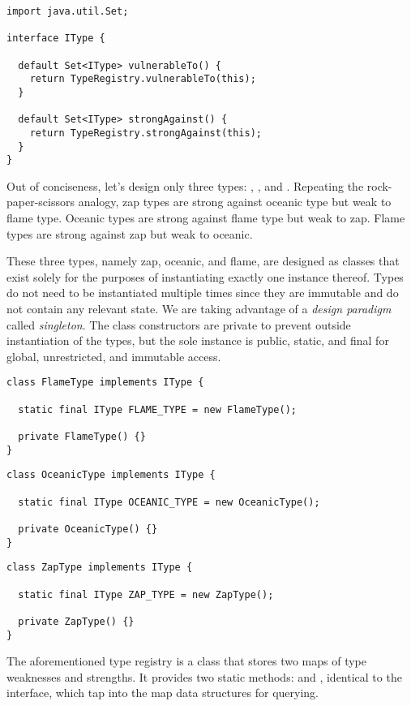 \begin{lstlisting}[language=MyJava]
import java.util.Set;

interface IType {

  default Set<IType> vulnerableTo() {
    return TypeRegistry.vulnerableTo(this);
  }

  default Set<IType> strongAgainst() {
    return TypeRegistry.strongAgainst(this);
  }
}
\end{lstlisting}

Out of conciseness, let's design only three types: , , and . Repeating the rock-paper-scissors analogy, zap types are strong against oceanic type but weak to flame type. Oceanic types are strong against flame type but weak to zap. Flame types are strong against zap but weak to oceanic. 

These three types, namely zap, oceanic, and flame, are designed as classes that exist solely for the purposes of instantiating exactly one instance thereof. 
Types do not need to be instantiated multiple times since they are immutable and do not contain any relevant state. 
We are taking advantage of a \emph{design paradigm} called \emph{singleton}. 
The class constructors are private to prevent outside instantiation of the types, but the sole instance is public, static, and final for global, unrestricted, and immutable access.

\begin{lstlisting}[language=MyJava]
class FlameType implements IType {

  static final IType FLAME_TYPE = new FlameType();

  private FlameType() {}
}
\end{lstlisting}

\begin{lstlisting}[language=MyJava]
class OceanicType implements IType {

  static final IType OCEANIC_TYPE = new OceanicType();

  private OceanicType() {}
}
\end{lstlisting}

\begin{lstlisting}[language=MyJava]
class ZapType implements IType {

  static final IType ZAP_TYPE = new ZapType();

  private ZapType() {}
}
\end{lstlisting}

The aforementioned type registry is a class that stores two maps of type weaknesses and strengths. 
It provides two static methods:  and , identical to the  interface, which tap into the map data structures for querying.

